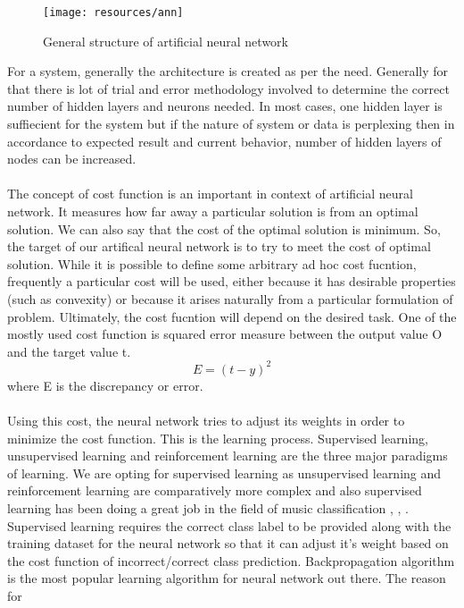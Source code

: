\begin{figure}[h!]
        \texttt{[image: resources/ann]}
        \caption{General structure of artificial neural network}
\end{figure}
For a system, generally the architecture is created as per the need. Generally for that there is lot of trial and error methodology involved
to determine the correct number of hidden layers and neurons needed. In most cases, one hidden layer is suffiecient for the system but if 
the nature of system or data is perplexing then in accordance to expected result and current behavior, number of hidden layers of nodes can be increased.\\
\\
The concept of cost function is an important in context of artificial neural network. It measures how far away a particular solution is from an
optimal solution. We can also say that the cost of the optimal solution is minimum. So, the target of our artifical neural network is to
try to meet the cost of optimal solution. While it is possible to define some arbitrary ad hoc cost fucntion, frequently a particular cost will be used, either
because it has desirable properties (such as convexity) or because it arises naturally from a particular formulation of problem. Ultimately, the cost
fucntion will depend on the desired task. One of the mostly used cost function is squared error measure between the output value O and the target value t.
\begin{equation}
        E = (t-y)^2
\end{equation}
where E is the discrepancy or error.\\
\\
Using this cost, the neural network tries to adjust its weights in order to minimize the cost function. This is the learning process.
Supervised learning, unsupervised learning and reinforcement learning are the three major paradigms of learning. We are opting for supervised learning as
unsupervised learning and reinforcement learning are comparatively more complex and also supervised learning has been doing a
great job in the field of music classification \cite{Neumayer2004}, \cite{Haggblade2011}, \cite{Kour2015}. Supervised learning 
requires the correct class label to be provided along with the training dataset for the neural network so that it can adjust it's weight based on the cost function 
of incorrect/correct class prediction. Backpropagation algorithm is the most popular learning algorithm for neural network out there. The reason for
